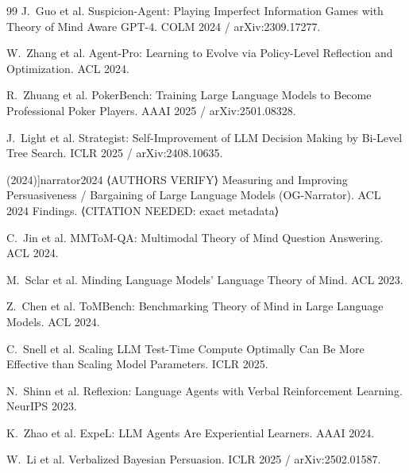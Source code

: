 \documentclass[11pt]{article}
\begin{document}
\begin{thebibliography}{99}
J.~Guo et al. \newblock Suspicion-Agent: Playing Imperfect Information Games with Theory of Mind Aware GPT-4.
\newblock COLM 2024 / arXiv:2309.17277.

W.~Zhang et al. \newblock Agent-Pro: Learning to Evolve via Policy-Level Reflection and Optimization.
\newblock ACL 2024.

R.~Zhuang et al. \newblock PokerBench: Training Large Language Models to Become Professional Poker Players.
\newblock AAAI 2025 / arXiv:2501.08328.

J.~Light et al. \newblock Strategist: Self-Improvement of LLM Decision Making by Bi-Level Tree Search.
\newblock ICLR 2025 / arXiv:2408.10635.

\bibitem[[NARRATOR](2024)]{narrator2024}
⟨AUTHORS VERIFY⟩ \newblock Measuring and Improving Persuasiveness / Bargaining of Large Language Models (OG-Narrator).
\newblock ACL 2024 Findings. ⟨CITATION NEEDED: exact metadata⟩

C.~Jin et al. \newblock MMToM-QA: Multimodal Theory of Mind Question Answering.
\newblock ACL 2024.

M.~Sclar et al. \newblock Minding Language Models' Language Theory of Mind.
\newblock ACL 2023.

Z.~Chen et al. \newblock ToMBench: Benchmarking Theory of Mind in Large Language Models.
\newblock ACL 2024.

C.~Snell et al. \newblock Scaling LLM Test-Time Compute Optimally Can Be More Effective than Scaling Model Parameters.
\newblock ICLR 2025.

N.~Shinn et al. \newblock Reflexion: Language Agents with Verbal Reinforcement Learning.
\newblock NeurIPS 2023.

K.~Zhao et al. \newblock ExpeL: LLM Agents Are Experiential Learners.
\newblock AAAI 2024.

W.~Li et al. \newblock Verbalized Bayesian Persuasion.
\newblock ICLR 2025 / arXiv:2502.01587.

\end{thebibliography}
\end{document}

